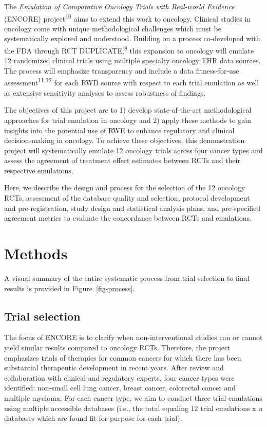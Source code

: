 \documentclass[
  letterpaper,
  DIV=11,
  numbers=noendperiod]{scrartcl}
\begin{document}
The \emph{Emulation of Comparative Oncology Trials with Real-world
Evidence} (ENCORE) project\textsuperscript{10} aims to extend this work
to oncology. Clinical studies in oncology come with unique
methodological challenges which must be systematically explored and
understood. Building on a process co-developed with the FDA through RCT
DUPLICATE,\textsuperscript{8} this expansion to oncology will emulate 12
randomized clinical trials using multiple specialty oncology EHR data
sources. The process will emphasize transparency and include a data
fitness-for-use assessment\textsuperscript{11,12} for each RWD source
with respect to each trial emulation as well as extensive sensitivity
analyses to assess robustness of findings.

The objectives of this project are to 1) develop state-of-the-art
methodological approaches for trial emulation in oncology and 2) apply
these methods to gain insights into the potential use of RWE to enhance
regulatory and clinical decision-making in oncology. To achieve these
objectives, this demonstration project will systematically emulate 12
oncology trials across four cancer types and assess the agreement of
treatment effect estimates between RCTs and their respective emulations.

Here, we describe the design and process for the selection of the 12
oncology RCTs, assessment of the database quality and selection,
protocol development and pre-registration, study design and statistical
analysis plans, and pre-specified agreement metrics to evaluate the
concordance between RCTs and emulations.

\section{Methods}\label{methods}

A visual summary of the entire systematic process from trial selection
to final results is provided in Figure~\ref{fig-process}.

\subsection{Trial selection}\label{trial-selection}

The focus of ENCORE is to clarify when non-interventional studies can or
cannot yield similar results compared to oncology RCTs. Therefore, the
project emphasizes trials of therapies for common cancers for which
there has been substantial therapeutic development in recent years.
After review and collaboration with clinical and regulatory experts,
four cancer types were identified: non-small cell lung cancer, breast
cancer, colorectal cancer and multiple myeloma. For each cancer type, we
aim to conduct three trial emulations using multiple accessible
databases (i.e., the total equaling 12 trial emulations x \emph{n}
databases which are found fit-for-purpose for each trial).
\end{document}
